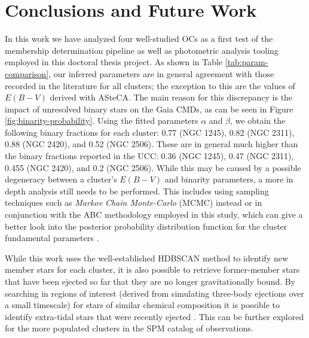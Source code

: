 \section{Conclusions and Future Work}

In this work we have analyzed four well-studied OCs as a first test of the membership determination pipeline as well as photometric analysis tooling employed in this doctoral thesis project. As shown in Table \ref{tab:param-comparison}, our inferred parameters are in general agreement with those recorded in the literature for all clusters; the exception to this are the values of $E(B - V)$ derived with ASteCA. The main reason for this discrepancy is the impact of unresolved binary stars on the Gaia CMDs, as can be seen in Figure \ref{fig:binarity-probability}. Using the fitted parameters $\alpha$ and $\beta$, we obtain the following binary fractions for each cluster: 0.77 (NGC 1245), 0.82 (NGC 2311), 0.88 (NGC 2420), and 0.52 (NGC 2506). These are in general much higher than the binary fractions reported in the UCC: 0.36 (NGC 1245), 0.47 (NGC 2311), 0.455 (NGC 2420), and 0.2 (NGC 2506). While this may be caused by a possible degeneracy between a cluster's $E(B - V)$ and binarity parameters, a more in depth analysis still needs to be performed. This includes using sampling techniques such as \textit{Markov Chain Monte-Carlo} (MCMC) instead or in conjunction with the ABC methodology employed in this study, which can give a better look into the posterior probability distribution function for the cluster fundamental parameters \autocite{craiuApproximateMethodsBayesian2023}.

While this work uses the well-established HDBSCAN method to identify new member stars for each cluster, it is also possible to retrieve former-member stars that have been ejected so far that they are no longer gravitationally bound. By searching in regions of interest (derived from simulating three-body ejections over a small timescale) for stars of similar chemical composition it is possible to identify extra-tidal stars that were recently ejected \autocite{grondinSearchingExtratidalStars2023}. This can be further explored for the more populated clusters in the SPM catalog of observations.

